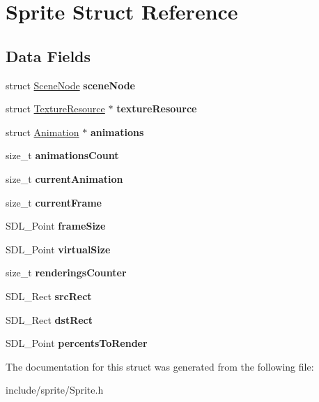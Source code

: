\hypertarget{struct_sprite}{}\section{Sprite Struct Reference}
\label{struct_sprite}
\subsection*{Data Fields}
\begin{DoxyCompactItemize}
\item 
\hypertarget{struct_sprite_aca8025f56fb4ce20b974ec9a3292a9e4}{}\label{struct_sprite_aca8025f56fb4ce20b974ec9a3292a9e4} 
struct \hyperlink{struct_scene_node}{Scene\+Node} {\bfseries scene\+Node}
\item 
\hypertarget{struct_sprite_aedd0da0c072332f83e64105f8682bbdf}{}\label{struct_sprite_aedd0da0c072332f83e64105f8682bbdf} 
struct \hyperlink{struct_texture_resource}{Texture\+Resource} $\ast$ {\bfseries texture\+Resource}
\item 
\hypertarget{struct_sprite_a23497f8f3357b38faee4390a9250a140}{}\label{struct_sprite_a23497f8f3357b38faee4390a9250a140} 
struct \hyperlink{struct_animation}{Animation} $\ast$ {\bfseries animations}
\item 
\hypertarget{struct_sprite_abe2355bebafd752b94a82a7a3b89c4fb}{}\label{struct_sprite_abe2355bebafd752b94a82a7a3b89c4fb} 
size\+\_\+t {\bfseries animations\+Count}
\item 
\hypertarget{struct_sprite_a712df7aeb9afad06723b1d6039536010}{}\label{struct_sprite_a712df7aeb9afad06723b1d6039536010} 
size\+\_\+t {\bfseries current\+Animation}
\item 
\hypertarget{struct_sprite_a3ff28beecee781f499b33b0884780b85}{}\label{struct_sprite_a3ff28beecee781f499b33b0884780b85} 
size\+\_\+t {\bfseries current\+Frame}
\item 
\hypertarget{struct_sprite_a00e3e84ed927380c31f4dc8c78b9ece0}{}\label{struct_sprite_a00e3e84ed927380c31f4dc8c78b9ece0} 
S\+D\+L\+\_\+\+Point {\bfseries frame\+Size}
\item 
\hypertarget{struct_sprite_adb68fcb1538fd0cf266d60d269fd692a}{}\label{struct_sprite_adb68fcb1538fd0cf266d60d269fd692a} 
S\+D\+L\+\_\+\+Point {\bfseries virtual\+Size}
\item 
\hypertarget{struct_sprite_aa0f217b6015a263a7772e05119a14cb2}{}\label{struct_sprite_aa0f217b6015a263a7772e05119a14cb2} 
size\+\_\+t {\bfseries renderings\+Counter}
\item 
\hypertarget{struct_sprite_a0717c803d1a988e69bf04032a0a1adb6}{}\label{struct_sprite_a0717c803d1a988e69bf04032a0a1adb6} 
S\+D\+L\+\_\+\+Rect {\bfseries src\+Rect}
\item 
\hypertarget{struct_sprite_a80f3f86b8f750b604dd07a40509447e0}{}\label{struct_sprite_a80f3f86b8f750b604dd07a40509447e0} 
S\+D\+L\+\_\+\+Rect {\bfseries dst\+Rect}
\item 
\hypertarget{struct_sprite_aa3f156d306f0208105c9789d7a363d72}{}\label{struct_sprite_aa3f156d306f0208105c9789d7a363d72} 
S\+D\+L\+\_\+\+Point {\bfseries percents\+To\+Render}
\end{DoxyCompactItemize}


The documentation for this struct was generated from the following file\+:\begin{DoxyCompactItemize}
\item 
include/sprite/Sprite.\+h\end{DoxyCompactItemize}
